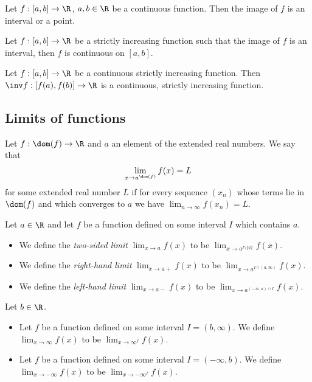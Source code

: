 \documentclass{article}
\begin{document}
\setcounter{theorem}{8}
\begin{theorem}
    Let $f:[a,b]\to\R$, $a,b\in\R$ be a continuous function. Then the
    image of $f$ is an interval or a point.
\end{theorem}

\begin{theorem}
    Let $f:[a,b]\to\R$ be a strictly increasing function such that
    the image of $f$ is an interval, then $f$ is continuous on $[a,b]$.
\end{theorem}

\begin{theorem}
    Let $f:[a,b]\to\R$ be a continuous strictly increasing function.
    Then $\inv f:[f(a),f(b)]\to\R$ is a continuous, strictly increasing
    function.
\end{theorem}

\subsection{Limits of functions}

\begin{definition}
    Let $f:\dom(f)\to\R$ and $a$ an element of the extended real numbers. We say
    that
    \begin{align*}
        \lim_{x\to a^{\dom(f)}}f(x)=L
    \end{align*}
    for some extended real number $L$ if
    for every sequence $(x_n)$ whose terms lie in $\dom(f)$ and which converges
    to $a$ we have $\lim_{n\to\infty}f(x_n)=L$.
\end{definition}

\begin{definition}
    Let $a\in\R$ and let $f$ be a function defined on some interval
    $I$ which contains $a$.
    \begin{itemize}
        \item We define the \emph{two-sided limit} $\lim_{x\to a}f(x)$ to be $\lim_{x\to a^{I\setminus\{a\}}}f(x)$.
        \item We define the \emph{right-hand limit} $\lim_{x\to a+}f(x)$ to be $\lim_{x\to a^{I\cap (a, \infty)}}f(x)$.
        \item We define the \emph{left-hand limit} $\lim_{x\to a-}f(x)$ to be $\lim_{x\to a^{(-\infty,a)\cap I}}f(x)$.
    \end{itemize}
\end{definition}

\begin{definition}
    Let $b\in\R$.
    \begin{itemize}
        \item Let $f$ be a function defined on some interval $I=(b,\infty)$.
              We define $\lim_{x\to\infty}f(x)$ to be $\lim_{x\to\infty^I}f(x)$.
        \item Let $f$ be a function defined on some interval $I=(-\infty, b)$.
              We define $\lim_{x\to-\infty}f(x)$ to be $\lim_{x\to-\infty^I}f(x).$
    \end{itemize}
\end{definition}
\end{document}
